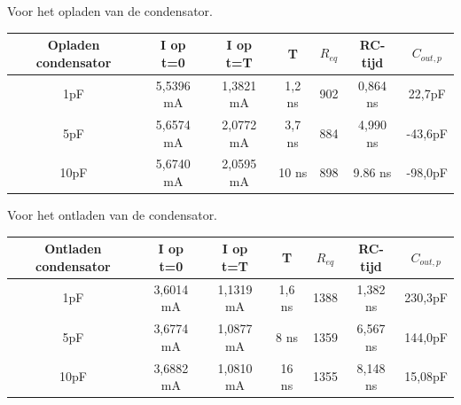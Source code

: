 \documentclass{article}
\begin{document}
\begin{center}

Voor het opladen van de condensator.

\begin{tabular}{|c |c |c | c| c|c |c|}
	\hline
Opladen condensator	& I op t=0	& I op t=T 	&  T 		& $R_{eq}$		&RC-tijd 	& $C_{out,p}$ \\
	\hline
1pF 				& 5,5396 mA	& 1,3821 mA	& 1,2 ns	& 902\Omega	& 0,864 ns	& 22,7pF \\
	\hline
5pF				& 5,6574 mA	& 2,0772 mA	&3,7 ns	& 884\Omega	& 4,990 ns	& -43,6pF  \\
	\hline
10pF				&5,6740 mA	& 2,0595 mA	& 10 ns	& 898\Omega	& 9.86 ns	& -98,0pF \\
	\hline
\end{tabular}
\newline

Voor het ontladen van de condensator.

\begin{tabular}{|c |c |c | c| c|c |c|}
	\hline
Ontladen condensator	& I op t=0	& I op t=T 	&  T 		& $R_{eq}$		&RC-tijd 	& $C_{out,p}$ \\
	\hline
1pF 				& 3,6014 mA	& 1,1319 mA	& 1,6 ns	& 1388\Omega	& 1,382 ns	& 230,3pF \\
	\hline
5pF				& 3,6774 mA	& 1,0877 mA	& 8 ns 	& 1359\Omega	& 6,567 ns	& 144,0pF  \\
	\hline
10pF				& 3,6882 mA	& 1,0810 mA	& 16 ns	& 1355\Omega	& 8,148 ns	& 15,08pF \\
	\hline

\end{tabular}
\end{center}
\end{document}
